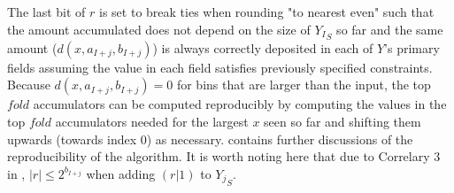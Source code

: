 \documentclass[12pt]{article}
\theoremstyle{plain}
\begin{document}
      The last bit of $r$ is set to break ties when rounding "to nearest even" such that the amount accumulated does not depend on the size of ${Y_I}_S$ so far and the same amount ($d(x, a_{I + j}, b_{I + j})$) is always correctly deposited in each of $Y$'s primary fields assuming the value in each field satisfies previously specified constraints. Because $d(x, a_{I + j}, b_{I + j}) = 0$ for bins that are larger than the input, the top $fold$ accumulators can be computed reproducibly by computing the values in the top $fold$ accumulators needed for the largest $x$ seen so far and shifting them upwards (towards index $0$) as necessary. \cite{repsum} contains further discussions of the reproducibility of the algorithm.
      It is worth noting here that due to Correlary $3$ in \cite{repsum}, $|r| \leq 2^{b_{I + j}}$ when adding $(r | 1)$ to ${Y_j}_S$.
\end{document}
